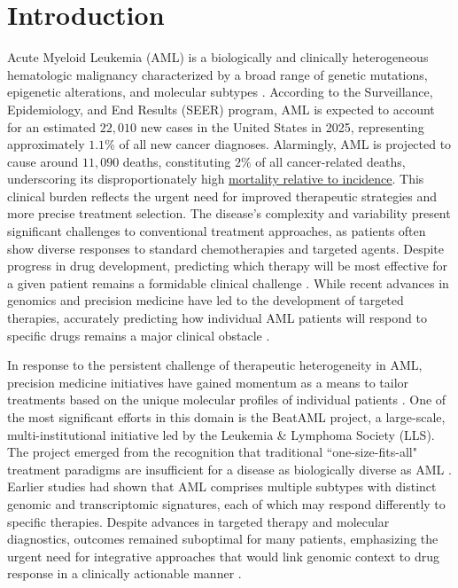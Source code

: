 \documentclass[pdflatex,sn-mathphys-num]{sn-jnl}%
\theoremstyle{thmstyleone}%
\theoremstyle{thmstyletwo}%
\theoremstyle{thmstylethree}%
\begin{document}
\section{Introduction}\label{sec1}
Acute Myeloid Leukemia (AML) is a biologically and clinically heterogeneous hematologic malignancy characterized by a broad range of genetic mutations, epigenetic alterations, and molecular subtypes \cite{cancer2013genomic, papaemmanuil2016genomic, kurzer2023updates}. According to the Surveillance, Epidemiology, and End Results (SEER) program, AML is expected to account for an estimated $22,010$ new cases in the United States in 2025, representing approximately $1.1\%$ of all new cancer diagnoses. Alarmingly, AML is projected to cause around $11,090$ deaths, constituting $2\%$ of all cancer-related deaths, underscoring its disproportionately high \href{https://seer.cancer.gov/ , https://www.cancer.org/cancer/types/acute-myeloid-leukemia/about/key-statistics.html}{mortality relative to incidence}. This clinical burden reflects the urgent need for improved therapeutic strategies and more precise treatment selection. The disease's complexity and variability present significant challenges to conventional treatment approaches, as patients often show diverse responses to standard chemotherapies and targeted agents. Despite progress in drug development, predicting which therapy will be most effective for a given patient remains a formidable clinical challenge \cite{tyner2018functional,yu2020advances}. While recent advances in genomics and precision medicine have led to the development of targeted therapies, accurately predicting how individual AML patients will respond to specific drugs remains a major clinical obstacle \cite{shafiei2025omics}.

In response to the persistent challenge of therapeutic heterogeneity in AML, precision medicine initiatives have gained momentum as a means to tailor treatments based on the unique molecular profiles of individual patients \cite{lohse2018precision}. One of the most significant efforts in this domain is the BeatAML project, a large-scale, multi-institutional initiative led by the Leukemia \& Lymphoma Society (LLS). The project emerged from the recognition that traditional ``one-size-fits-all" treatment paradigms are insufficient for a disease as biologically diverse as AML \cite{bottomly2022integrative}. Earlier studies had shown that AML comprises multiple subtypes with distinct genomic and transcriptomic signatures, each of which may respond differently to specific therapies. Despite advances in targeted therapy and molecular diagnostics, outcomes remained suboptimal for many patients, emphasizing the urgent need for integrative approaches that would link genomic context to drug response in a clinically actionable manner \cite{mo2023integrative, bottomly2022integrative}.
\end{document}
